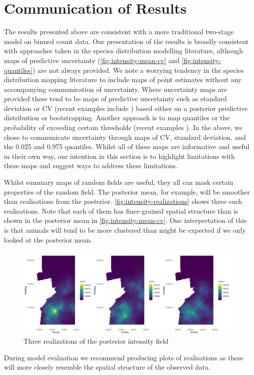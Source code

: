 \documentclass[preprint,12pt]{elsarticle}
\begin{document}
  

\clearpage %

\section{Communication of Results}

The results presented above are consistent with a more traditional two-stage model on binned count data.  Our presentation of the results is broadly consistent with approaches taken in the species distribution modelling literature, although maps of predictive uncertainty (\autoref{fig:intensity-mean-cv} and \autoref{fig:intensity-quantiles}) are not always provided.  We note a worrying tendency in the species distribution mapping literature to include maps of point estimates without any accompanying communication of uncertainty.  Where uncertainty maps are provided these tend to be maps of predictive uncertainty such as standard deviation or CV (recent examples include \cite{ fuller_novel_2018, vallejo_responses_2017,bradbury_mapping_2014}) based either on a posterior predictive distribution or bootstrapping.  Another approach is to map quantiles or the probability of exceeding certain thresholds (recent examples \cite{russell_avoidance_2016, wilson_hierarchical_2010}).  In the above, we chose to communicate uncertainty through maps of CV, standard deviation, and the 0.025 and 0.975 quantiles.  Whilst all of these maps are informative and useful in their own way, our intention in this section is to highlight limitations with these maps and suggest ways to address these limitations.  

Whilst summary maps of random fields are useful, they all can mask certain properties of the random field. The posterior mean, for example, will be smoother than realisations from the posterior.  \autoref{fig:intensity-realizations} shows three such realisations.  Note that each of them has finer-grained spatial structure than is shown in the posterior mean in \autoref{fig:intensity-mean-cv}.  One interpretation of this is that animals will tend to be more clustered than might be expected if we only looked at the posterior mean.
\begin{figure}
	\includegraphics[scale=0.35]{figures/intensity_realized.png}
	\caption{Three realizations of the posterior intensity field}
	\label{fig:intensity-realizations}
\end{figure}
During model evaluation we recommend producing plots of realisations as these will more closely resemble the spatial structure of the observed data.  
\end{document}
